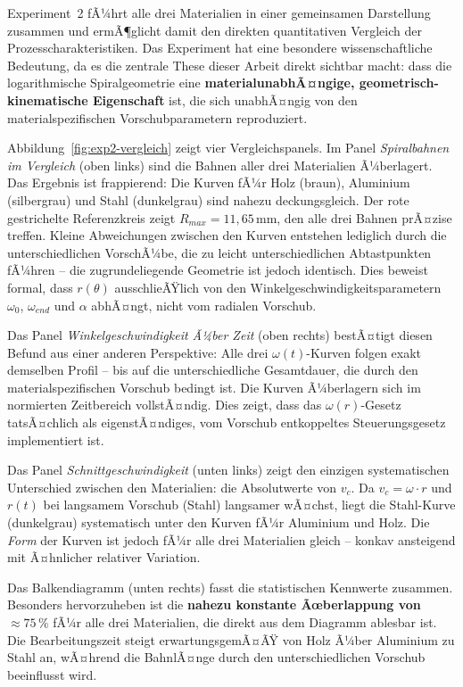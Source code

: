 ﻿\documentclass[12pt,a4paper]{article}
\begin{document}
Experiment~2 fÃ¼hrt alle drei Materialien in einer gemeinsamen Darstellung zusammen und ermÃ¶glicht damit den direkten quantitativen Vergleich der Prozesscharakteristiken. Das Experiment hat eine besondere wissenschaftliche Bedeutung, da es die zentrale These dieser Arbeit direkt sichtbar macht: dass die logarithmische Spiralgeometrie eine \textbf{materialunabhÃ¤ngige, geometrisch-kinematische Eigenschaft} ist, die sich unabhÃ¤ngig von den materialspezifischen Vorschubparametern reproduziert.

Abbildung~\ref{fig:exp2-vergleich} zeigt vier Vergleichspanels. Im Panel \textit{Spiralbahnen im Vergleich} (oben links) sind die Bahnen aller drei Materialien Ã¼berlagert. Das Ergebnis ist frappierend: Die Kurven fÃ¼r Holz (braun), Aluminium (silbergrau) und Stahl (dunkelgrau) sind nahezu deckungsgleich. Der rote gestrichelte Referenzkreis zeigt $R_{max} = 11{,}65\,\text{mm}$, den alle drei Bahnen prÃ¤zise treffen. Kleine Abweichungen zwischen den Kurven entstehen lediglich durch die unterschiedlichen VorschÃ¼be, die zu leicht unterschiedlichen Abtastpunkten fÃ¼hren -- die zugrundeliegende Geometrie ist jedoch identisch. Dies beweist formal, dass $r(\theta)$ ausschlieÃŸlich von den Winkelgeschwindigkeitsparametern $\omega_0$, $\omega_{end}$ und $\alpha$ abhÃ¤ngt, nicht vom radialen Vorschub.

Das Panel \textit{Winkelgeschwindigkeit Ã¼ber Zeit} (oben rechts) bestÃ¤tigt diesen Befund aus einer anderen Perspektive: Alle drei $\omega(t)$-Kurven folgen exakt demselben Profil -- bis auf die unterschiedliche Gesamtdauer, die durch den materialspezifischen Vorschub bedingt ist. Die Kurven Ã¼berlagern sich im normierten Zeitbereich vollstÃ¤ndig. Dies zeigt, dass das $\omega(r)$-Gesetz tatsÃ¤chlich als eigenstÃ¤ndiges, vom Vorschub entkoppeltes Steuerungsgesetz implementiert ist.

Das Panel \textit{Schnittgeschwindigkeit} (unten links) zeigt den einzigen systematischen Unterschied zwischen den Materialien: die Absolutwerte von $v_c$. Da $v_c = \omega \cdot r$ und $r(t)$ bei langsamem Vorschub (Stahl) langsamer wÃ¤chst, liegt die Stahl-Kurve (dunkelgrau) systematisch unter den Kurven fÃ¼r Aluminium und Holz. Die \textit{Form} der Kurven ist jedoch fÃ¼r alle drei Materialien gleich -- konkav ansteigend mit Ã¤hnlicher relativer Variation.

Das Balkendiagramm (unten rechts) fasst die statistischen Kennwerte zusammen. Besonders hervorzuheben ist die \textbf{nahezu konstante Ãœberlappung von $\approx 75\,\%$} fÃ¼r alle drei Materialien, die direkt aus dem Diagramm ablesbar ist. Die Bearbeitungszeit steigt erwartungsgemÃ¤ÃŸ von Holz Ã¼ber Aluminium zu Stahl an, wÃ¤hrend die BahnlÃ¤nge durch den unterschiedlichen Vorschub beeinflusst wird.
\end{document}
